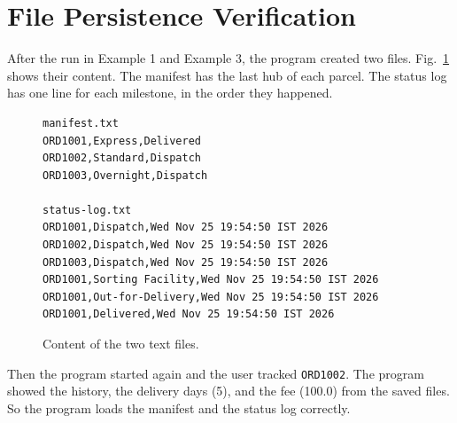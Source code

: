 \section{File Persistence Verification}
After the run in Example 1 and Example 3, the program created two files.
Fig.~\ref{fig:files} shows their content. The manifest has the last hub of each
parcel. The status log has one line for each milestone, in the order they
happened.

\begin{figure}[h]
\begin{lstlisting}[style=console]
manifest.txt
ORD1001,Express,Delivered
ORD1002,Standard,Dispatch
ORD1003,Overnight,Dispatch

status-log.txt
ORD1001,Dispatch,Wed Nov 25 19:54:50 IST 2026
ORD1002,Dispatch,Wed Nov 25 19:54:50 IST 2026
ORD1003,Dispatch,Wed Nov 25 19:54:50 IST 2026
ORD1001,Sorting Facility,Wed Nov 25 19:54:50 IST 2026
ORD1001,Out-for-Delivery,Wed Nov 25 19:54:50 IST 2026
ORD1001,Delivered,Wed Nov 25 19:54:50 IST 2026
\end{lstlisting}
\caption{Content of the two text files.}
\label{fig:files}
\end{figure}

Then the program started again and the user tracked \texttt{ORD1002}. The program
showed the history, the delivery days (5), and the fee (100.0) from the saved
files. So the program loads the manifest and the status log correctly.
